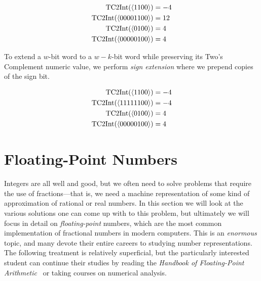\begin{example}
  \begin{align}
    \mathrm{TC2Int}(\langle 1100 \rangle) &= -4 \\
    \mathrm{TC2Int}(\langle 00001100 \rangle) &= 12 \\
    \mathrm{TC2Int}(\langle 0100 \rangle) &= 4 \\
    \mathrm{TC2Int}(\langle 00000100 \rangle) &= 4
  \end{align}
\end{example}

To extend a $w$-bit word to a $w-k$-bit word while preserving its
Two's Complement numeric value, we perform \emph{sign extension} where
we prepend copies of the sign bit.

\begin{example}
  \begin{align}
    \mathrm{TC2Int}(\langle 1100 \rangle) &= -4 \\
    \mathrm{TC2Int}(\langle 11111100 \rangle) &= -4 \\
    \mathrm{TC2Int}(\langle 0100 \rangle) &= 4 \\
    \mathrm{TC2Int}(\langle 00000100 \rangle) &= 4
  \end{align}
\end{example}

\section{Floating-Point Numbers}
\label{sec:floats}

Integers are all well and good, but we often need to solve problems
that require the use of fractions---that is, we need a machine
representation of some kind of approximation of rational or real
numbers.  In this section we will look at the various solutions one
can come up with to this problem, but ultimately we will focus in
detail on \emph{floating-point} numbers, which are the most common
implementation of fractional numbers in modern computers.  This is an
\emph{enormous} topic, and many devote their entire careers to
studying number representations.  The following treatment is
relatively superficial, but the particularly interested student can
continue their studies by reading the \emph{Handbook of Floating-Point
  Arithmetic}~\cite{muller2018handbook} or taking courses on numerical
analysis.

